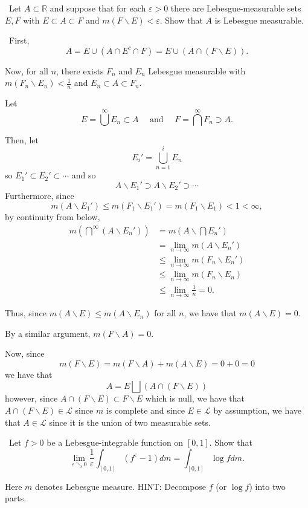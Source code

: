 \documentclass[12pt]{Qual}
\begin{document}
\begin{problem} $\,$
Let $A\subset\mathbb{R}$ and suppose that for each $\varepsilon>0$ there are Lebesgue-measurable sets $E,F$ with $E\subset A\subset F$ and $m(F\backslash E)<\varepsilon.$ Show that $A$ is Lebesgue measurable.
\end{problem}


\begin{solution}$\,$
First, $$A=E\cup(A\cap E^c\cap F)=E\cup(A\cap(F\backslash E)).$$

Now, for all $n$, there exists $F_n$ and $E_n$ Lebesgue measurable with $m(F_n\backslash E_n)<\frac{1}{n}$ and $E_n\subset A\subset F_n.$

Let $$E=\bigcup^\infty E_n\subset A\quad\text{ and }\quad F=\bigcap^\infty F_n\supset A.$$

Then, let $$E_i'=\bigcup^i_{n=1}E_n$$ so $E_1'\subset E_2'\subset\cdots$ and so $$A\backslash E_1'\supset A\backslash E_2'\supset \cdots$$ Furthermore, since $$m(A\backslash E_1')\le m(F_1\backslash E_1')=m(F_1\backslash E_1)<1<\infty,$$ by continuity from below, \begin{align*}
    m(\bigcap^\infty(A\backslash E_n'))&=m(A\backslash\bigcap E_n')\\
    &=\lim_{n\to\infty}m(A\backslash E_n')\\
    &\le\lim_{n\to\infty}m(F_n\backslash E_n')\\
    &\le\lim_{n\to\infty}m(F_n\backslash E_n)\\
    &\le\lim_{n\to\infty}\frac{1}{n}=0.
\end{align*}

Thus, since $m(A\backslash E)\le m(A\backslash E_n)$ for all $n$, we have that $m(A\backslash E)=0$.

By a similar argument, $m(F\backslash A)=0$.

Now, since $$m(F\backslash E)=m(F\backslash A)+m(A\backslash E)=0+0=0$$ we have that $$A=E\bigsqcup(A\cap (F\backslash E))$$ however, since $A\cap(F\backslash E)\subset F\backslash E$ which is null, we have that $A\cap (F\backslash E)\in\mathscr{L}$ since $m$ is complete and since $E\in\mathscr{L}$ by assumption, we have that $A\in\mathscr{L}$ since it is the union of two measurable sets.
\end{solution}
\newpage

\begin{problem} $\,$
Let $f>0$ be a Lebesgue-integrable function on $[0,1]$. Show that $$\lim_{\varepsilon\searrow0}\frac{1}{\varepsilon}\int_{[0,1]}(f^\varepsilon-1)dm=\int_{[0,1]}\log fdm.$$

Here $m$ denotes Lebesgue measure. HINT: Decompose $f$ (or $\log f$) into two parts.
\end{problem}
\end{document}
